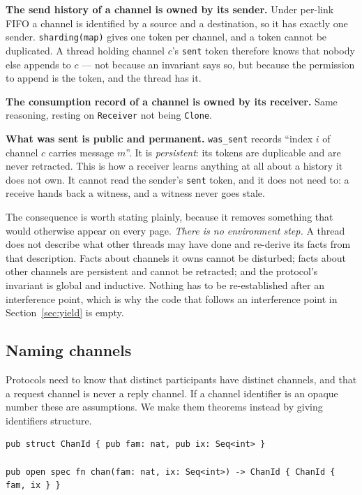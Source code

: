 \documentclass[11pt]{article}
\newcommand{\code}[1]{\texttt{#1}}
\newcommand{\srcname}[1]{%
  \vspace{0.9em}\noindent{\sffamily\scriptsize\color{comment}\MakeUppercase{#1}}\par
  \vspace{-0.7em}}
\begin{document}
\textbf{The send history of a channel is owned by its sender.} Under per-link
FIFO a channel is identified by a source and a destination, so it has exactly
one sender. \code{sharding(map)} gives one token per channel, and a token cannot
be duplicated. A thread holding channel $c$'s \code{sent} token therefore knows
that nobody else appends to $c$ --- not because an invariant says so, but
because the permission to append is the token, and the thread has it.

\textbf{The consumption record of a channel is owned by its receiver.} Same
reasoning, resting on \code{Receiver} not being \code{Clone}.

\textbf{What was sent is public and permanent.} \code{was\_sent} records
``index $i$ of channel $c$ carries message $m$''. It is \emph{persistent}: its
tokens are duplicable and are never retracted. This is how a receiver learns
anything at all about a history it does not own. It cannot read the sender's
\code{sent} token, and it does not need to: a receive hands back a witness, and
a witness never goes stale.

The consequence is worth stating plainly, because it removes something that
would otherwise appear on every page. \emph{There is no environment step.} A
thread does not describe what other threads may have done and re-derive its
facts from that description. Facts about channels it owns cannot be disturbed;
facts about other channels are persistent and cannot be retracted; and the
protocol's invariant is global and inductive. Nothing has to be re-established
after an interference point, which is why the code that follows an interference
point in Section~\ref{sec:yield} is empty.

\subsection*{Naming channels}

Protocols need to know that distinct participants have distinct channels, and
that a request channel is never a reply channel. If a channel identifier is an
opaque number these are assumptions. We make them theorems instead by giving
identifiers structure.

\srcname{src/tok.rs --- channel names}
\begin{lstlisting}
pub struct ChanId { pub fam: nat, pub ix: Seq<int> }

pub open spec fn chan(fam: nat, ix: Seq<int>) -> ChanId { ChanId { fam, ix } }
\end{lstlisting}
\end{document}
